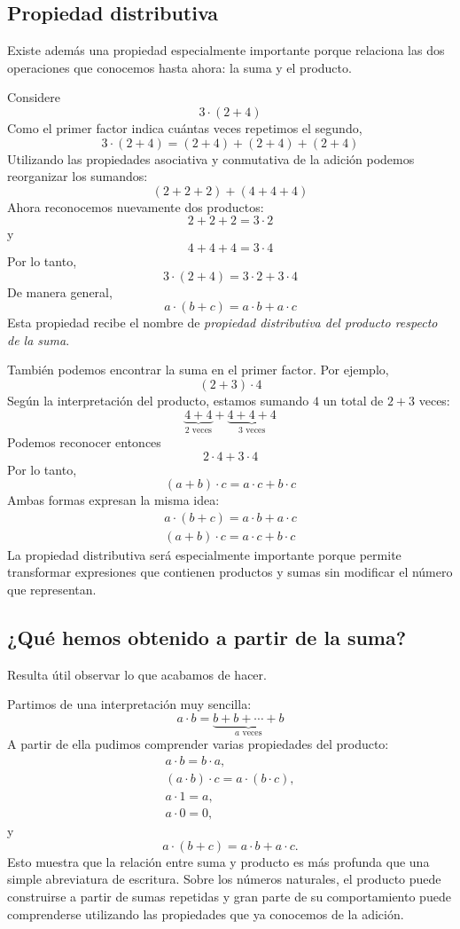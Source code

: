 \subsection{Propiedad distributiva}

Existe además una propiedad especialmente importante porque relaciona las dos operaciones que conocemos hasta ahora: la suma y el producto.

Considere
\[
3\cdot(2+4)
\]
Como el primer factor indica cuántas veces repetimos el segundo,
\[
3\cdot(2+4)
=
(2+4)+(2+4)+(2+4)
\]
Utilizando las propiedades asociativa y conmutativa de la adición podemos reorganizar los sumandos:
\[
(2+2+2)+(4+4+4)
\]
Ahora reconocemos nuevamente dos productos:
\[
2+2+2=3\cdot2
\]
y
\[
4+4+4=3\cdot4
\]
Por lo tanto,
\[
3\cdot(2+4)
=
3\cdot2+3\cdot4
\]
De manera general,
\[
a\cdot(b+c)
=
a\cdot b+a\cdot c
\]
Esta propiedad recibe el nombre de \emph{propiedad distributiva del producto respecto de la suma}.

También podemos encontrar la suma en el primer factor. Por ejemplo,
\[
(2+3)\cdot4
\]
Según la interpretación del producto, estamos sumando \(4\) un total de \(2+3\) veces:
\[
\underbrace{4+4}_{2\text{ veces}}
+
\underbrace{4+4+4}_{3\text{ veces}}
\]
Podemos reconocer entonces
\[
2\cdot4+3\cdot4
\]
Por lo tanto,
\[
(a+b)\cdot c
=
a\cdot c+b\cdot c
\]
Ambas formas expresan la misma idea:
\begin{gather*}
a\cdot(b+c)=a\cdot b+a\cdot c \\
(a+b)\cdot c=a\cdot c+b\cdot c
\end{gather*}
La propiedad distributiva será especialmente importante porque permite transformar expresiones que contienen productos y sumas sin modificar el número que representan.

\subsection{¿Qué hemos obtenido a partir de la suma?}

Resulta útil observar lo que acabamos de hacer.

Partimos de una interpretación muy sencilla:
\[
a\cdot b
=
\underbrace{b+b+\cdots+b}_{a\text{ veces}}
\]
A partir de ella pudimos comprender varias propiedades del producto:
\begin{gather*}
  a\cdot b=b\cdot a,\\
  (a\cdot b)\cdot c=a\cdot(b\cdot c),\\
  a\cdot1=a,\\
  a\cdot0=0,
\end{gather*}
y
\[
a\cdot(b+c)=a\cdot b+a\cdot c.
\]
Esto muestra que la relación entre suma y producto es más profunda que una simple abreviatura de escritura. Sobre los números naturales, el producto puede construirse a partir de sumas repetidas y gran parte de su comportamiento puede comprenderse utilizando las propiedades que ya conocemos de la adición.

